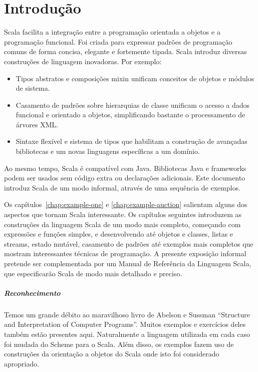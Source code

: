 \documentclass[a4paper,12pt,twoside,titlepage]{book}
\begin{document}
\frontmatter
\makedoctitle
\clearemptydoublepage
\tableofcontents
\mainmatter
\sloppy

\chapter{\label{chap:intro}Introdu\c{c}\~{a}o}

Scala facilita a integra\c{c}\~{a}o entre a  programa\c{c}\~{a}o orientada a objetos e a programa\c{c}\~{a}o funcional.
Foi criada para expressar padr\~{o}es de programa\c{c}\~{a}o comuns de forma concisa, elegante e fortemente tipada. 
Scala introduz diversas constru\c{c}\~{o}es de linguagem inovadoras. Por exemplo:

\begin{itemize}

\item
Tipos abstratos e composi\c{c}\~{o}es mixin unificam conceitos de objetos e m\'{o}dulos de sistema.
\item
Casamento de padr\~{o}es sobre hierarquias de classe unificam o acesso a dados funcional e orientado a 
objetos, simplificando bastante o processamento de \'{a}rvores XML.
\item
Sintaxe flex\'{i}vel e sistema de tipos que habilitam a constru\c{c}\~{a}o de avan\c{c}adas 
bibliotecas e um novas linguagens espec\'{i}ficas a um dom\'{i}nio.
\end{itemize}

Ao mesmo tempo, Scala \'{e} compat\'{i}vel com Java. Bibliotecas Java e frameworks
podem ser usados sem c\'{o}digo extra ou declara\c{c}\~{o}es adicionais.
Este documento introduz Scala de um modo informal, atrav\'{e}s de uma sequ\^{e}ncia
de exemplos.

Os cap\'{i}tulos~\ref{chap:example-one} e \ref{chap:example-auction}
salientam alguns dos aspectos que tornam Scala interessante. Os
cap\'{i}tulos seguintes introduzem as constru\c{c}\~{o}es da linguagem Scala de um
modo mais completo, come\c{c}ando com express\~{o}es e fun\c{c}\~{o}es simples, e 
desenvolvendo at\'{e} objetos e classes, listas e streams, estado 
mut\'{a}vel, casamento de padr\~{o}es at\'{e} exemplos mais completos que mostram
interessantes t\'{e}cnicas de programa\c{c}\~{a}o. A presente exposi\c{c}\~{a}o informal
pretende ser complementada por um Manual de Refer\^{e}ncia da Linguagem Scala, que
especificar\~{a}o Scala de modo mais detalhado e preciso. 

\paragraph{Reconhecimento}

Temos um grande d\'{e}bito ao maravilhoso livro de Abelson e Sussman
``Structure and Interpretation of Computer
Programs''\cite{abelson-sussman:structure}. Muitos exemplos e exerc\'{i}cios 
deles tamb\'{e}m est\~{a}o presentes aqui. Naturalmente a linguagem utilizada em
cada caso foi mudada do Scheme para o Scala. Al\'{e}m disso, os exemplos
fazem uso de constru\c{c}\~{o}es da orienta\c{c}\~{a}o a objetos do Scala onde isto foi
considerado apropriado. 




\end{document}
